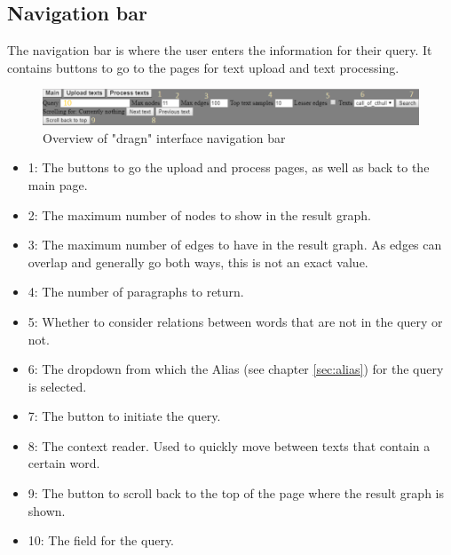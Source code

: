 \subsection{Navigation bar}
\label{subsec:navbar}
The navigation bar is where the user enters the information for their query. It contains buttons to go to the pages for text upload and text processing.
\begin{figure}[H]
    \centering
    \hspace*{-1,5cm}
    \includegraphics[scale=0.8]{fig/search-interface}
    \caption{Overview of "dragn" interface navigation bar}
    \label{fig:navbar}
\end{figure}
\begin{itemize}
    \item 1: The buttons to go the upload and process pages, as well as back to the main page.
    \item 2: The maximum number of nodes to show in the result graph.
    \item 3: The maximum number of edges to have in the result graph. As edges can overlap and generally go both ways, this is not an exact value.
    \item 4: The number of paragraphs to return.
    \item 5: Whether to consider relations between words that are not in the query or not.
    \item 6: The dropdown from which the Alias (see chapter \ref{sec:alias}) for the query is selected.
    \item 7: The button to initiate the query.
    \item 8: The context reader. Used to quickly move between texts that contain a certain word.
    \item 9: The button to scroll back to the top of the page where the result graph is shown.
    \item 10: The field for the query.
\end{itemize}


